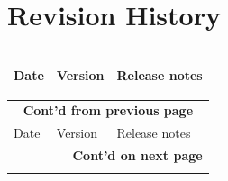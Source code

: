\section*{Revision History}\label{revision-history}
\rhead{\Navigation}

\begin{longtable}[l]{ | m{2cm} | m{1.5cm} | m{12cm} | } \hline

    \rowcolor{lightgray}
    Date & Version & \hypertarget{Release notes}{Release notes}\\\hline
    \endfirsthead

    \multicolumn{3}{c}{\bfseries Cont'd from previous page}\\\hline
    \rowcolor{lightgray}
    Date & Version & Release notes\\\hline
    \endhead

    \multicolumn{3}{r}{\textbf{Cont'd on next page}}\\
    \endfoot

    \endlastfoot


\end{longtable}
